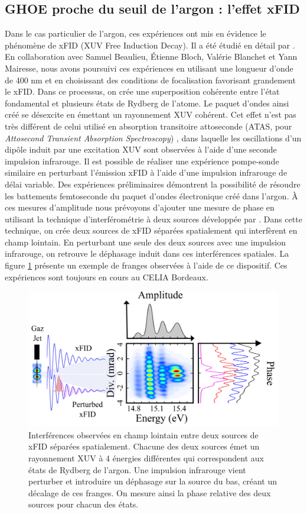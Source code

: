 \subsection{GHOE proche du seuil de l'argon : l'effet xFID}
Dans le cas particulier de l'argon, ces expériences ont mis en évidence le phénomène de xFID (XUV Free Induction Decay). Il a été étudié en détail par . En collaboration avec Samuel Beaulieu, \'{E}tienne Bloch, Valérie Blanchet et Yann Mairesse, nous avons poursuivi ces expériences en utilisant une longueur d'onde de 400 nm et en choisissant des conditions de focalisation favorisant grandement le xFID. Dans ce processus, on crée une superposition cohérente entre l'état fondamental et plusieurs états de Rydberg de l'atome. Le paquet d'ondes ainsi créé se désexcite en émettant un rayonnement XUV cohérent. Cet effet n'est pas très différent de celui utilisé en absorption transitoire attoseconde (ATAS, pour \textit{Attosecond Transient Absorption Spectroscopy}) , dans laquelle les oscillations d'un dipôle induit par une excitation XUV sont observées à l'aide d'une seconde impulsion infrarouge. Il est possible de réaliser une expérience pompe-sonde similaire en perturbant l'émission xFID à l'aide d'une impulsion infrarouge de délai variable. Des expériences préliminaires démontrent la possibilité de résoudre les battements femtoseconde du paquet d'ondes électronique créé dans l'argon. \`A ces mesures d'amplitude nous prévoyons d'ajouter une mesure de phase en utilisant la technique d'interférométrie à deux sources développée par . Dans cette technique, on crée deux sources de xFID séparées spatialement qui interfèrent en champ lointain. En perturbant une seule des deux sources avec une impulsion infrarouge, on retrouve le déphasage induit dans ces interférences spatiales. La figure \ref{fig:xfid_deuxsources} présente un exemple de franges observées à l'aide de ce dispositif. Ces expériences sont toujours en cours au CELIA Bordeaux. 

\begin{figure}[!ht]
\centering
\includegraphics[width=.8\columnwidth]{Figures/Conclusion/xfid_deuxsources.png}%
\caption{Interférences observées en champ lointain entre deux sources de xFID séparées spatialement. Chacune des deux sources émet un rayonnement XUV à 4 énergies différentes qui correspondent aux états de Rydberg de l'argon. Une impulsion infrarouge vient perturber et introduire un déphasage sur la source du bas, créant un décalage de ces franges. On mesure ainsi la phase relative des deux sources pour chacun des états.}
\label{fig:xfid_deuxsources}
\end{figure}

